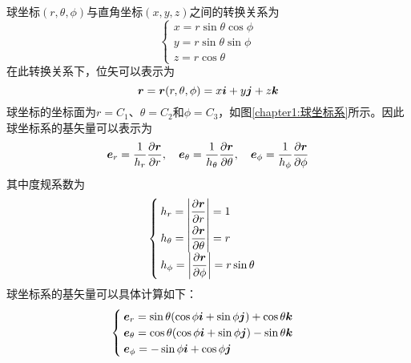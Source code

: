 球坐标$(r,\theta,\phi)$与直角坐标$(x,y,z)$之间的转换关系为
\begin{equation}
	\begin{cases}
		x = r\sin \theta \cos \phi \\
		y = r\sin \theta \sin \phi \\
		z = r\cos \theta
	\end{cases}
\end{equation}
在此转换关系下，位矢可以表示为
\begin{equation}
	\boldsymbol{r} = \boldsymbol{r}(r,\theta,\phi) = x\boldsymbol{i} + y\boldsymbol{j} + z\boldsymbol{k} 
\end{equation}
球坐标的坐标面为$r = C_1$、$\theta = C_2$和$\phi = C_3$，如图\ref{chapter1:球坐标系}所示。因此球坐标系的基矢量可以表示为
\begin{equation}
	\boldsymbol{e}_r = \frac{1}{h_r} \frac{\partial \boldsymbol{r}}{\partial r},\quad \boldsymbol{e}_\theta = \frac{1}{h_\theta} \frac{\partial \boldsymbol{r}}{\partial \theta},\quad \boldsymbol{e}_\phi = \frac{1}{h_\phi} \frac{\partial \boldsymbol{r}}{\partial \phi}
\end{equation}
其中度规系数为
\begin{equation}
	\begin{cases}
		h_r = \left|\dfrac{\partial \boldsymbol{r}}{\partial r}\right| = 1 \\
		h_\theta = \left|\dfrac{\partial \boldsymbol{r}}{\partial \theta}\right| = r \\
		h_\phi = \left|\dfrac{\partial \boldsymbol{r}}{\partial \phi}\right| = r\sin \theta
	\end{cases}
\end{equation}
球坐标系的基矢量可以具体计算如下：
\begin{equation}
	\begin{cases}
		\boldsymbol{e}_r = \sin \theta(\cos \phi \boldsymbol{i} + \sin \phi \boldsymbol{j}) + \cos \theta \boldsymbol{k} \\
		\boldsymbol{e}_\theta = \cos \theta(\cos \phi \boldsymbol{i} + \sin \phi \boldsymbol{j}) - \sin \theta \boldsymbol{k} \\
		\boldsymbol{e}_\phi = -\sin \phi \boldsymbol{i} + \cos \phi \boldsymbol{j}
	\end{cases}
\end{equation}

